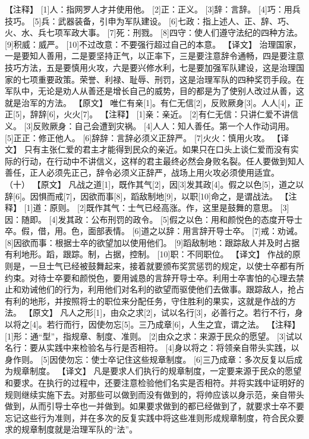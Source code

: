 \documentclass[a4paper,12pt,UTF8,twoside]{ctexbook}
\begin{document}
【注释】
[1]人：指网罗人才并使用他。
[2]正：正义。
[3]辞：言辞。
[4]巧：用兵技巧。
[5]兵：武器装备，引申为军队建设。
[6]七政：指上述人、正、辞、巧、火、水、兵七项军政大事。
[7]死：刑戮。
[8]四守：使人们遵守法纪的四种方法。
[9]积威：威严。
[10]不过改意：不要强行超过自己的本意。
【译文】
治理国家，一是要知人善用，二是要坚持正气，以正率下，三是要注意辞令通畅，四是要注意技巧方法，五是要慎用火攻，六是要兴修水利，七是要加强军队建设，这是治理国家的七项重要政策。荣誉、利禄、耻辱、刑罚，这是治理军队的四种奖罚手段。在军队中，无论是劝人从善还是增长自己的威势，目的都是为了使别人改过从善，这就是治军的方法。
【原文】
唯仁有亲[1]。有仁无信[2]，反败厥身[3]。人人[4]，正正[5]，辞辞[6]，火火[7]。
【注释】
[1]亲：亲近。
[2]有仁无信：只讲仁爱不讲信义。
[3]反败厥身：自己会遭到灾祸。
[4]人人：知人善任。第一个人作动词用。
[5]正正：修正他人。
[6]辞辞：言辞必须义正辞严。
[7]火火：慎用火攻。
【译文】
只有主张仁爱的君主才能得到民众的亲近。如果只在口头上谈仁爱而没有实际的行动，在行动中不讲信义，这样的君主最终必然会身败名裂。任人要做到知人善任，正人必须先正己，辞令必须义正辞严，战场上用火攻必须使用适宜。
（十）
【原文】
凡战之道[1]，既作其气[2]，因[3]发其政[4]。假之以色[5]，道之以辞[6]。因惧而戒[7]，因欲而事[8]，蹈敌制地[9]，以职[10]命之，是谓战法。
【注释】
[1]道：原则。
[2]既作其气：士气已经高涨。作，这里是鼓舞的意思。
[3]因：随即。
[4]发其政：公布刑罚的政令。
[5]假之以色：用和颜悦色的态度开导士卒。假，借，用。色，面部表情。
[6]道之以辞：用言辞开导士卒。
[7]戒：劝诫。
[8]因欲而事：根据士卒的欲望加以使用他们。
[9]蹈敌制地：跟踪敌人并及时占据有利地形。蹈，跟踪。制，占据，控制。
[10]职：不同职位。
【译文】
作战的原则是，一旦士气已经被鼓舞起来，接着就要颁布奖赏惩罚的规定，以使士卒都有所约束。对待士卒要和颜悦色，要用诚恳的言辞开导士卒。利用士卒害怕的心理去禁止和劝诫他们的行为，利用他们对名利的欲望而驱使他们去做事。跟踪敌人，抢占有利的地形，并按照将士的职位来分配任务，守住胜利的果实，这就是作战的方法。
【原文】
凡人之形[1]，由众之求[2]，试以名行[3]，必善行之。若行不行，身以将之[4]。若行而行，因使勿忘[5]。三乃成章[6]，人生之宜，谓之法。
【注释】
[1]形：通“型”，指规章、制度、准则。
[2]由众之求：来源于民众的愿望。
[3]试以名行：要从实践中来检验名与行是否相符。
[4]身以将之：将领亲自带头实践，以身作则。
[5]因使勿忘：使士卒记住这些规章制度。
[6]三乃成章：多次反复以后成为规章制度。
【译文】
凡是要求人们执行的规章制度，一定要来源于民众的愿望和要求。在执行的过程中，还要注意检验他们名实是否相符。并将实践中证明好的规则继续实施下去。对那些可以做到而没有做到的，将帅应该以身示范，亲自带头做到，从而引导士卒也一并做到。如果要求做到的都已经做到了，就要求士卒不要忘记这些行为准则，并在多次的反复实践中将这些准则形成规章制度，符合民众要求的规章制度就是治理军队的“法”。
\end{document}
